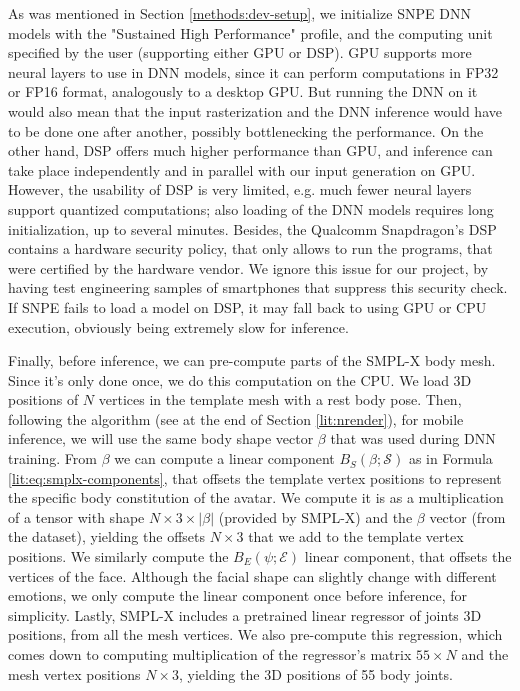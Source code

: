 As was mentioned in Section \ref{methods:dev-setup}, we initialize SNPE DNN models with the "Sustained High Performance" profile, and the computing unit specified by the user (supporting either GPU or DSP). GPU supports more neural layers to use in DNN models, since it can perform computations in FP32 or FP16 format, analogously to a desktop GPU. But running the DNN on it would also mean that the input rasterization and the DNN inference would have to be done one after another, possibly bottlenecking the performance. On the other hand, DSP offers much higher performance than GPU, and inference can take place independently and in parallel with our input generation on GPU. However, the usability of DSP is very limited, e.g. much fewer neural layers support quantized computations; also loading of the DNN models requires long initialization, up to several minutes. Besides, the Qualcomm Snapdragon's DSP contains a hardware security policy, that only allows to run the programs, that were certified by the hardware vendor. We ignore this issue for our project, by having test engineering samples of smartphones that suppress this security check. If SNPE fails to load a model on DSP, it may fall back to using GPU or CPU execution, obviously being extremely slow for inference.

Finally, before inference, we can pre-compute parts of the SMPL-X \cite{dnn:smplx19} body mesh. Since it's only done once, we do this computation on the CPU. We load 3D positions of $N$ vertices in the template mesh with a rest body pose. Then, following the algorithm (see at the end of Section \ref{lit:nrender}), for mobile inference, we will use the same body shape vector $\beta$ that was used during DNN training. From $\beta$ we can compute a linear component $B_S(\beta; \mathcal{S})$ as in Formula \ref{lit:eq:smplx-components}, that offsets the template vertex positions to represent the specific body constitution of the avatar. We compute it is as a multiplication of a tensor with shape $N \times 3 \times \lvert\beta\rvert$ (provided by SMPL-X) and the $\beta$ vector (from the dataset), yielding the offsets $N \times 3$ that we add to the template vertex positions. We similarly compute the $B_E(\psi; \mathcal{E})$ linear component, that offsets the vertices of the face. Although the facial shape can slightly change with different emotions, we only compute the linear component once before inference, for simplicity. Lastly, SMPL-X includes a pretrained linear regressor of joints 3D positions, from all the mesh vertices. We also pre-compute this regression, which comes down to computing multiplication of the regressor's matrix $55 \times N$ and the mesh vertex positions $N \times 3$, yielding the 3D positions of 55 body joints. 


